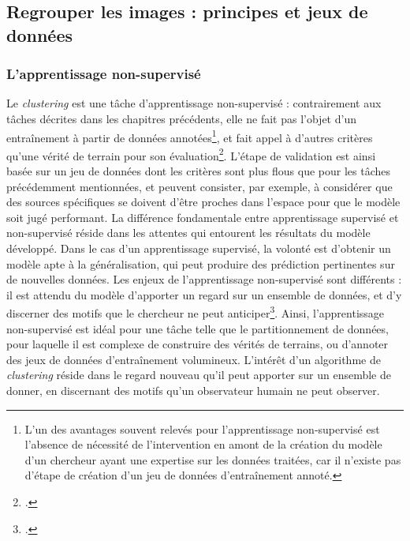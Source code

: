 
\subsection{Regrouper les images : principes et jeux de données}
    \subsubsection{L'apprentissage non-supervisé}
    Le \textit{clustering} est une tâche d'apprentissage non-supervisé : contrairement aux tâches décrites dans les chapitres précédents, elle ne fait pas l'objet d'un entraînement à partir de données annotées\footnote{L'un des avantages souvent relevés pour l'apprentissage non-supervisé est l'absence de nécessité de l'intervention en amont de la création du modèle d'un chercheur ayant une expertise sur les données traitées, car il n'existe pas d'étape de création d'un jeu de données d'entraînement annoté.}, et fait appel à d'autres critères qu'une vérité de terrain pour son évaluation\footcite{Clustering}. L'étape de validation est ainsi basée sur un jeu de données dont les critères sont plus flous que pour les tâches précédemment mentionnées, et peuvent consister, par exemple, à considérer que des sources spécifiques se doivent d'être proches dans l'espace pour que le modèle soit jugé performant. La différence fondamentale entre apprentissage supervisé et non-supervisé réside dans les attentes qui entourent les résultats du modèle développé. Dans le cas d'un apprentissage supervisé, la volonté est d'obtenir un modèle apte à la généralisation, qui peut produire des prédiction pertinentes sur de nouvelles données. Les enjeux de l'apprentissage non-supervisé sont différents : il est attendu du modèle d'apporter un regard sur un ensemble de données, et d'y discerner des motifs que le chercheur ne peut anticiper\footcite{deluaSupervisedVsUnsupervised2021}. Ainsi, l'apprentissage non-supervisé est idéal pour une tâche telle que le partitionnement de données, pour laquelle il est complexe de construire des vérités de terrains, ou d'annoter des jeux de données d'entraînement volumineux. L'intérêt d'un algorithme de \textit{clustering} réside dans le regard nouveau qu'il peut apporter sur un ensemble de donner, en discernant des motifs qu'un observateur humain ne peut observer.
    
